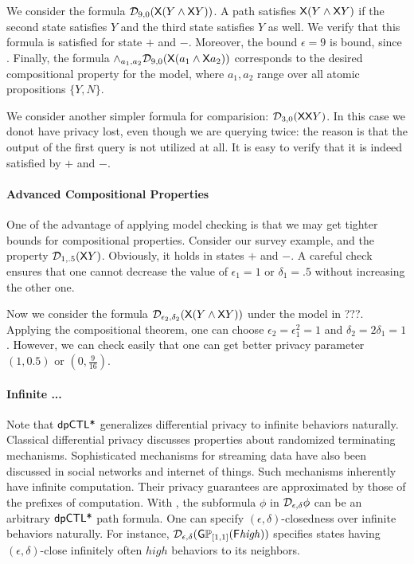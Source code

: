 We consider the formula $\mathcal{D}_{{9}, {0}} (\mathsf{X} (Y\wedge \mathsf{X} Y))$. A path satisfies $\mathsf{X} (Y\wedge \mathsf{X} Y)$ if the second state satisfies $Y$ and the third state satisfies $Y$ as well. We verify that this formula is satisfied  for state $+$ and $-$. Moreover, the bound $\epsilon=9$ is bound, since . Finally, the formula $\wedge_{a_1,a_2}\mathcal{D}_{{9}, {0}} (\mathsf{X} (a_1\wedge \mathsf{X} a_2))$ corresponds to the desired compositional property for the model, where $a_1,a_2$ range over all atomic propositions $\{Y,N\}$.

We consider another simpler formula for comparision: $\mathcal{D}_{{3}, {0}} (\mathsf{X} \mathsf{X} Y)$. In this case we donot have privacy lost, even though we are querying twice: the reason is that the output of the first query is not utilized at all. It is easy to verify that it is indeed satisfied by $+$ and $-$.

\paragraph{Advanced Compositional Properties}
One of the advantage of applying model checking is that we may get tighter bounds for compositional properties. Consider our survey example, and the property $\mathcal{D}_{{1}, {.5}} (\mathsf{X} Y)$. Obviously, it holds in states $+$ and $-$. A careful check ensures that one cannot decrease the value of $\epsilon_1=1$ or $\delta_1=.5$ without increasing the other one. 


Now we consider the formula $\mathcal{D}_{{\epsilon_2}, {\delta_2}} (\mathsf{X} (Y\wedge \mathsf{X} Y))$ under the model in ???. Applying the compositional theorem, one can choose $\epsilon_2=\epsilon_1^2=1$ and $\delta_2=2\delta_1=1$. However, we can check easily that one can get better privacy parameter $(1,0.5)$ or $(0,\frac{9}{16})$. 


\paragraph{Infinite ...}
Note that $\textsf{dpCTL*}$ generalizes differential privacy to infinite
behaviors naturally. Classical differential privacy discusses properties about
randomized terminating mechanisms. Sophisticated mechanisms for
streaming data have also been discussed in social networks and
internet of things. Such mechanisms inherently have infinite
computation. Their privacy guarantees are approximated by those of the
prefixes of computation.
With \dpCTL, the subformula $\phi$ in $\mathcal{D}_{{\epsilon}, {\delta}} \phi$
can be an arbitrary $\textsf{dpCTL*}$ path formula. One can specify
$(\epsilon, \delta)$-closedness over infinite behaviors naturally. For instance,
$\mathcal{D}_{{\epsilon}, {\delta}} (\mathsf{G} \mathbb{P}_{[1,1]} (\mathsf{F} \mathit{high}))$ 
specifies states having $(\epsilon, \delta)$-close
infinitely often $\mathit{high}$ behaviors to its neighbors.





